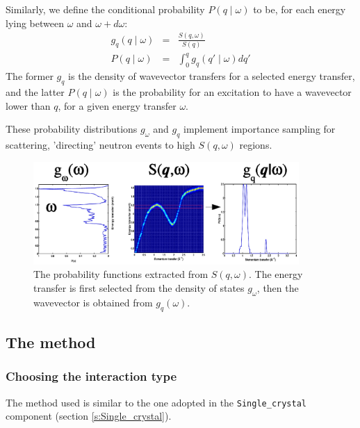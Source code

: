 Similarly, we define the conditional probability $P(q \mid \omega)$ to be, for each energy lying between $\omega$ and $\omega+d\omega$:
\begin{eqnarray}\label{eq:Pqw}
g_q(q\mid\omega) &=& \frac{S(q, \omega)}{S(q)} \\
P(q \mid \omega)    &=& \int_0^q g_q(q'\mid\omega) dq'
\end{eqnarray}
The former $g_q$ is the density of wavevector transfers for a selected energy transfer, and the latter $P(q \mid \omega)$ is the probability for an excitation to have a wavevector lower than $q$, for a given energy transfer $\omega$.

These probability distributions $g_\omega$ and $g_q$ implement importance sampling for scattering, 'directing' neutron events to high $S(q,\omega)$ regions.

\begin{figure}
  \begin{center}
    \includegraphics[width=0.9\textwidth]{figures/Sqw_sampling.eps}
  \end{center}
\caption{The probability functions extracted from $S(q,\omega)$. The energy transfer is first selected from the density of states $g_\omega$, then the wavevector is obtained from $g_q(\omega)$.}
\label{f:isotropic-sqw-proba}
\end{figure}


\subsection{The method}

\subsubsection{Choosing the interaction type}

The method used is similar to the one adopted in the \verb+Single_crystal+ component (section \ref{s:Single_crystal}).

